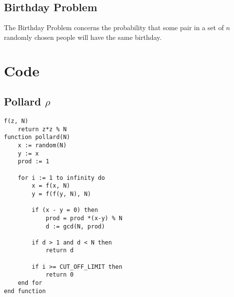 \documentclass[a4paper, 12pt]{report}
\begin{document}
\section{Birthday Problem}
\label{sec:birthday}
The Birthday Problem concerns the probability that some pair in a set of $n$ randomly chosen people will have the same birthday.

\chapter{Code}
\section{Pollard $\rho$}
\begin{lstlisting}[frame=single] 
f(z, N)
	return z*z % N
function pollard(N) 
	x := random(N) 
	y := x 	
	prod := 1

	for i := 1 to infinity do
		x = f(x, N)
		y = f(f(y, N), N)

		if (x - y = 0) then
			prod = prod *(x-y) % N
			d := gcd(N, prod)

		if d > 1 and d < N then
			return d

		if i >= CUT_OFF_LIMIT then
			return 0
	end for
end function
\end{lstlisting}
\end{document}
